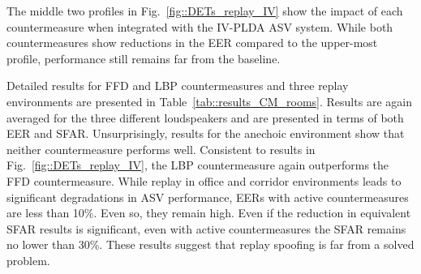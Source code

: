 The middle two profiles in Fig.~\ref{fig::DETs_replay_IV} show the impact of each countermeasure when integrated with the IV-PLDA ASV system.  %
While both countermeasures show reductions in the EER compared to the upper-most profile, performance still remains far from the baseline.


Detailed results for FFD and LBP countermeasures and three replay environments are presented in Table~\ref{tab::results_CM_rooms}.  Results are again averaged for the three different loudspeakers and are presented in terms of both EER and SFAR.  Unsurprisingly, results for the anechoic environment show that neither countermeasure performs well.  Consistent to results in Fig.~\ref{fig::DETs_replay_IV}, the LBP countermeasure again outperforms the FFD countermeasure.  While replay in office and corridor environments leads to significant degradations in ASV performance, EERs with active countermeasures are less than 10\%.  Even so, they remain high.  Even if the reduction in equivalent SFAR results is significant, even with active countermeasures the SFAR remains no lower than 30\%.  These results suggest that replay spoofing is far from a solved problem. %



